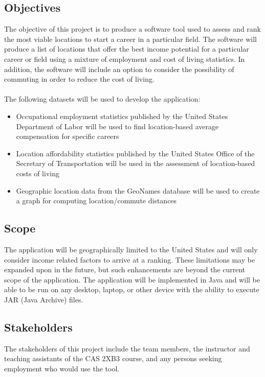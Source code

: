 \documentclass[english]{article}
\begin{document}
\subsection{Objectives}
\label{sub:obj}
The objective of this project is to produce a software tool used to assess and rank the most viable locations to start a career in a particular field. The software will produce a list of locations that offer the best income potential for a particular career or field using a mixture of employment and cost of living statistics. In addition, the software will include an option to consider the possibility of commuting in order to reduce the cost of living.\\\\

The following datasets will be used to develop the application:
\begin{itemize}
  \item Occupational employment statistics published by the United States Department of Labor \cite{ref:empstat} will be used to find location-based average compensation for specific careers
  \item Location affordability statistics published by the United States Office of the Secretary of Transportation \cite{ref:afford} will be used in the assessment of location-based costs of living
  \item Geographic location data from the GeoNames database \cite{ref:geo} will be used to create a graph for computing location/commute distances
\end{itemize}

\color{black}
\subsection{Scope}
\label{sub:scope}
The application will be geographically limited to the United States and will only consider income related factors to arrive at a ranking.  These limitations may be expanded upon in the future, but such enhancements are beyond the current scope of the application. The application will be implemented in Java and will be able to be run on any desktop, laptop, or other device with the ability to execute JAR (Java Archive) files.


\subsection{Stakeholders}
The stakeholders of this project include the team members, the instructor and teaching assistants of the CAS 2XB3 course, and any persons seeking employment who would use the tool.
\end{document}
